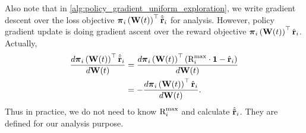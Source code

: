 Also note that in \cref{alg:policy_gradient_uniform_exploration}, we write gradient descent over the loss objective  ${\boldsymbol{\pi}}_{i}\left({\mathbf{W}}(t)\right)^\top \hat{{\tilde{\mathbf{r}}}}_i$ for analysis. However, policy gradient update is doing gradient ascent over the reward objective ${\boldsymbol{\pi}}_{i}\left({\mathbf{W}}(t)\right)^\top {\hat{\mathbf{r}}}_i$. Actually,
\begin{equation*}
\begin{split}
    \frac{d{\boldsymbol{\pi}}_{i}\left({\mathbf{W}}(t)\right)^\top \hat{{\tilde{\mathbf{r}}}}_i}{d {\mathbf{W}}(t)} &= \frac{d{\boldsymbol{\pi}}_{i}\left({\mathbf{W}}(t)\right)^\top \left( {\text{R}}_i^{\max} \cdot {\mathbf{1}} - {\hat{\mathbf{r}}}_i \right)}{d {\mathbf{W}}(t)} \\
    &= - \frac{d{\boldsymbol{\pi}}_{i}\left({\mathbf{W}}(t)\right)^\top {\hat{\mathbf{r}}}_i}{d {\mathbf{W}}(t)}.
\end{split}
\end{equation*}
Thus in practice, we do not need to know ${\text{R}}_i^{\max}$ and calculate $\hat{{\tilde{\mathbf{r}}}}_i$. They are defined for our analysis purpose.